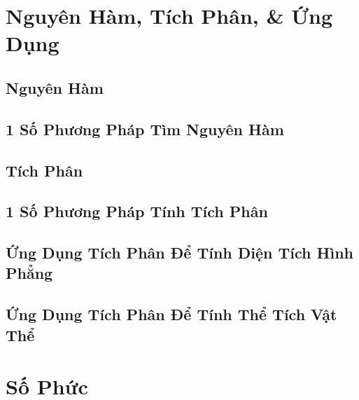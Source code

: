 \documentclass[oneside]{book}
\numberwithin{equation}{section}
\begin{document}

\chapter{Nguyên Hàm, Tích Phân, \& Ứng Dụng}

\section{Nguyên Hàm}


\section{1 Số Phương Pháp Tìm Nguyên Hàm}


\section{Tích Phân}


\section{1 Số Phương Pháp Tính Tích Phân}


\section{Ứng Dụng Tích Phân Để Tính Diện Tích Hình Phẳng}


\section{Ứng Dụng Tích Phân Để Tính Thể Tích Vật Thể}


\chapter{Số Phức}
\end{document}
